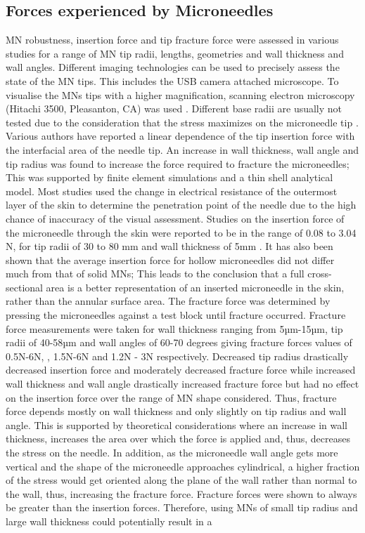 \begin{appendices}
\subsection{Forces experienced by Microneedles}
MN robustness, insertion force and tip fracture force were assessed in various studies \cite{davis_landis_adams_allen_prausnitz_2004, jung-hwan, römgens_bader_bouwstra_baaijens_oomens_2014} for a range of MN tip radii, lengths, geometries and wall thickness and  wall angles. Different imaging technologies can be used to precisely assess the state of the MN tips. This includes the USB camera attached microscope. To visualise the MNs tips with a higher magnification, scanning electron microscopy (Hitachi 3500, Pleasanton, CA) was used \cite{davis_landis_adams_allen_prausnitz_2004}. Different base radii are usually not tested due to the consideration that the stress maximizes on the microneedle tip \cite{formulas_stress}. Various authors have reported a linear dependence of the tip insertion force with the interfacial area of the needle tip. An increase in wall thickness, wall angle and tip radius was found to increase the force required to fracture the microneedles; This was supported by finite element simulations and a thin shell analytical model. Most studies used the change in electrical resistance of the outermost layer of the skin to determine the penetration point of the needle due to the high chance of inaccuracy of the visual assessment. Studies on the insertion force of the microneedle through the skin were reported to be in the range of 0.08 to 3.04 N,  for tip radii of 30 to 80 mm and wall thickness of 5mm \cite{davis_landis_adams_allen_prausnitz_2004}. It has also been shown that the average insertion force for hollow microneedles did not differ much from that of solid MNs; This leads to the conclusion that a full cross-sectional area is a better representation of an inserted microneedle in the skin, rather than the annular surface area. The fracture force was determined by pressing the microneedles against a test block until fracture occurred. Fracture force measurements were taken for wall thickness ranging from 5µm-15µm, tip radii of 40-58µm and wall angles of 60-70 degrees giving fracture forces values of 0.5N-6N, , 1.5N-6N and 1.2N - 3N respectively. Decreased tip radius drastically decreased insertion force and moderately decreased fracture force while increased wall thickness and wall angle drastically increased fracture force but had no effect on the insertion force over the range of MN shape considered. Thus, fracture force depends mostly on wall thickness and only slightly on tip radius and wall angle. This is supported by theoretical considerations where an increase in wall thickness, increases the area over which the force is applied and, thus, decreases the stress on the needle. In addition, as the microneedle wall angle gets more vertical and the shape of the microneedle approaches cylindrical, a higher fraction of the stress would get oriented along the plane of the wall rather than normal to the wall, thus, increasing the fracture force. Fracture forces were shown to always be greater than the insertion forces. Therefore, using MNs of small tip radius and large wall thickness could potentially result in a 
\end{appendices}
